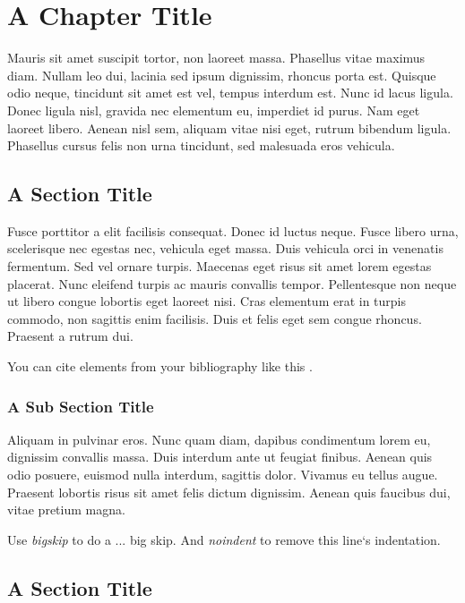 \chapter{A Chapter Title}

Mauris sit amet suscipit tortor, non laoreet massa. Phasellus vitae maximus diam. Nullam leo dui, lacinia sed ipsum dignissim, rhoncus porta est. Quisque odio neque, tincidunt sit amet est vel, tempus interdum est. Nunc id lacus ligula. Donec ligula nisl, gravida nec elementum eu, imperdiet id purus. Nam eget laoreet libero. Aenean nisl sem, aliquam vitae nisi eget, rutrum bibendum ligula. Phasellus cursus felis non urna tincidunt, sed malesuada eros vehicula.

\section{A Section Title}

Fusce porttitor a elit facilisis consequat. Donec id luctus neque. Fusce libero urna, scelerisque nec egestas nec, vehicula eget massa. Duis vehicula orci in venenatis fermentum. Sed vel ornare turpis. Maecenas eget risus sit amet lorem egestas placerat. Nunc eleifend turpis ac mauris convallis tempor. Pellentesque non neque ut libero congue lobortis eget laoreet nisi. Cras elementum erat in turpis commodo, non sagittis enim facilisis. Duis et felis eget sem congue rhoncus. Praesent a rutrum dui.

\bigskip
You can cite elements from your bibliography like this \cite{ARTICLE:Dijkstra:1}.

\subsection{A Sub Section Title}

Aliquam in pulvinar eros. Nunc quam diam, dapibus condimentum lorem eu, dignissim convallis massa. Duis interdum ante ut feugiat finibus. Aenean quis odio posuere, euismod nulla interdum, sagittis dolor. Vivamus eu tellus augue. Praesent lobortis risus sit amet felis dictum dignissim. Aenean quis faucibus dui, vitae pretium magna.

\bigskip\noindent
Use \emph{bigskip} to do a ... big skip. And \emph{noindent} to remove this line`s indentation.

\section{A Section Title}

